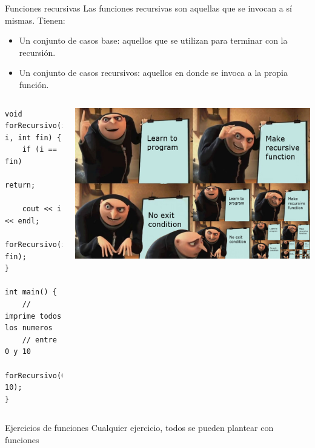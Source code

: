 \documentclass[12pt]{beamer}
\begin{document}
\begin{frame}[fragile]{Funciones recursivas}
    Las funciones recursivas son aquellas que \alert{se invocan a sí mismas}. Tienen: \\
    \begin{itemize}
        \item Un conjunto de \alert{casos base}: aquellos que se utilizan para terminar con la recursión.
        \item Un conjunto de \alert{casos recursivos}: aquellos en donde se invoca a la propia función.
    \end{itemize}
    \begin{columns}
        \begin{lstlisting}[basicstyle=\tiny]
void forRecursivo(int i, int fin) {
    if (i == fin)
        return;
    
    cout << i << endl;
    forRecursivo(i+1, fin);
}

int main() {
    // imprime todos los numeros
    // entre 0 y 10
    forRecursivo(0, 10);
}
\end{lstlisting}
    \includegraphics[width=\textwidth]{recursion.jpg}
    \end{columns}

\end{frame}

\begin{frame}{Ejercicios de funciones}
    \centering Cualquier ejercicio, todos se pueden plantear con funciones
\end{frame}
\end{document}
